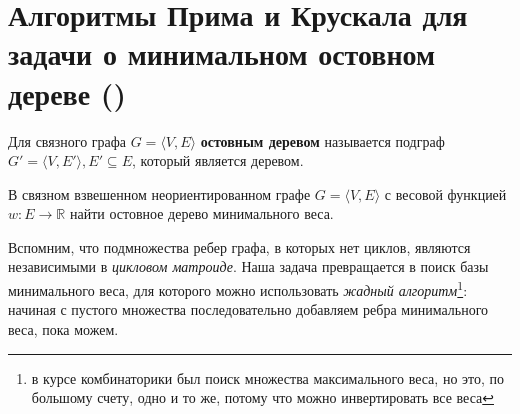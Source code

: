 \let\bf\bfseries
\let\it\itshape
\section{Алгоритмы Прима и Крускала для задачи о минимальном остовном дереве (\groth)}
\begin{definition}
	Для связного графа $G=\langle V,E\rangle$ {\bf остовным деревом} называется подграф $G'=\langle V,E'\rangle,E'\subseteq E$, который является деревом.
\end{definition}
\begin{problem*}
	В связном взвешенном неориентированном графе $G=\langle V,E\rangle$ с весовой функцией $w\colon E\to\mathbb{R}$ найти остовное дерево минимального веса.
\end{problem*}
Вспомним, что подмножества ребер графа, в которых нет циклов, являются независимыми в {\it цикловом матроиде}. Наша задача превращается в поиск базы минимального веса, для которого можно использовать {\it жадный алгоритм}\footnote{в курсе комбинаторики был поиск множества максимального веса, но это, по большому счету, одно и то же, потому что можно инвертировать все веса}: начиная с пустого множества последовательно добавляем ребра минимального веса, пока можем.

